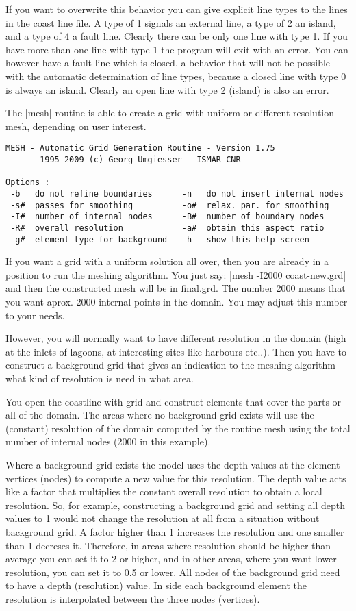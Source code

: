 If you want to overwrite this behavior you can give explicit line types to
the lines in the coast line file. A type of 1 signals an external line,
a type of 2 an island, and a type of 4 a fault line. Clearly there can
be only one line with type 1. If you have more than one line with type
1 the program will exit with an error. You can however have a fault line
which is closed, a behavior that will not be possible with the automatic
determination of line types, because a closed line with type 0 is always
an island. Clearly an open line with type 2 (island) is also an error.


The |mesh| routine is able to create a grid with uniform or  
different resolution mesh, depending on user interest.

\begin{verbatim}
MESH - Automatic Grid Generation Routine - Version 1.75 
       1995-2009 (c) Georg Umgiesser - ISMAR-CNR        

Options :
 -b   do not refine boundaries      -n   do not insert internal nodes
 -s#  passes for smoothing          -o#  relax. par. for smoothing   
 -I#  number of internal nodes      -B#  number of boundary nodes    
 -R#  overall resolution            -a#  obtain this aspect ratio    
 -g#  element type for background   -h   show this help screen  
\end{verbatim}


If you want a grid with a uniform solution all over, then
you are already in a position to run the meshing algorithm.
You just say: |mesh -I2000 coast-new.grd| and then
the constructed mesh will be in final.grd. The number 2000
means that you want aprox. 2000 internal points in the domain.
You may adjust this number to your needs.

However, you will normally want to have different resolution
in the domain (high at the inlets of lagoons, at interesting
sites like harbours etc..). Then you have to construct a
background grid that gives an indication to the meshing
algorithm what kind of resolution is need in what area.

You open the coastline with grid and construct elements
that cover the parts or all of the domain. The areas where
no background grid exists will use the (constant) resolution of the
domain computed by the routine mesh using the total number of
internal nodes (2000 in this example).

Where a background grid exists the model uses the depth values at the
element vertices (nodes) to compute a new value for this resolution.
The depth value acts like a factor that multiplies the constant
overall resolution to obtain a local resolution. So, for example,
constructing a background grid and setting all depth values to 1
would not change the resolution at all from a situation without
background grid. A factor higher than 1 increases the resolution
and one smaller than 1 decreses it. Therefore, in areas where
resolution should be higher than average you can set it to
2 or higher, and in other areas, where you want lower resolution,
you can set it to 0.5 or lower. All nodes of the background grid
need to have a depth (resolution) value. In side each background
element the resolution is interpolated between the three nodes
(vertices).

